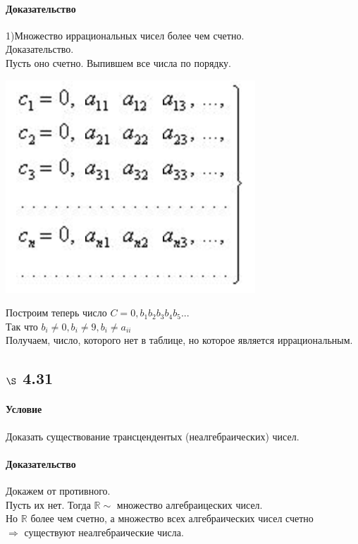 \documentclass[a4paper,12pt]{article}
\begin{document}
\paragraph*{Доказательство}
1)Множество иррациональных чисел более чем счетно.\\
Доказательство.\\
Пусть оно счетно. Выпившем все числа по порядку.\\
\begin{center}
  \includegraphics[scale=0.7]{image006.png}
\end{center}
Построим теперь число $C=0, b_1 b_2 b_3 b_4 b_5...$\\
Так что $b_i \neq 0, b_i \neq 9, b_i \neq a_{ii}$\\
Получаем, число, которого нет в таблице, но которое является иррациональным.   


\subsection*{$\S$ 4.31}
\paragraph*{Условие}
Доказать существование трансцендентых (неалгебраических) чисел.
\paragraph*{Доказательство}
Докажем от противного.\\
Пусть их нет. Тогда $ \mathbb{R} \sim $ множество алгебраицеских чисел.\\
Но $ \mathbb{R} $ более чем счетно, а множество всех алгебраических чисел счетно\\
$\Rightarrow$ существуют неалгебраические числа.
\end{document}

